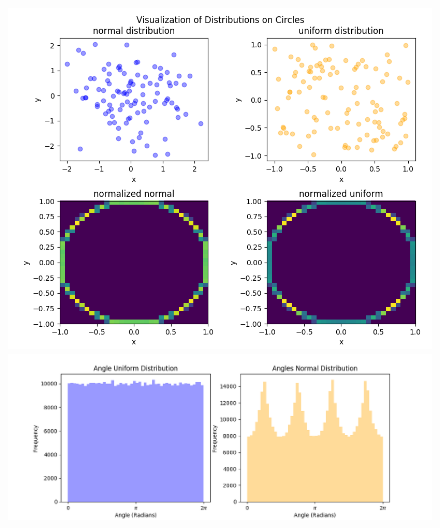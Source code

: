 \begin{figure}[htb!]
\begin{center}
\includegraphics[width=13.5cm]{styles/distributions}
  \caption{}\label{plot:distributions}
  \includegraphics[width=15.0cm]{styles/histograms}
    \caption{}\label{plot:histogram}
\end{center}
\end{figure}


